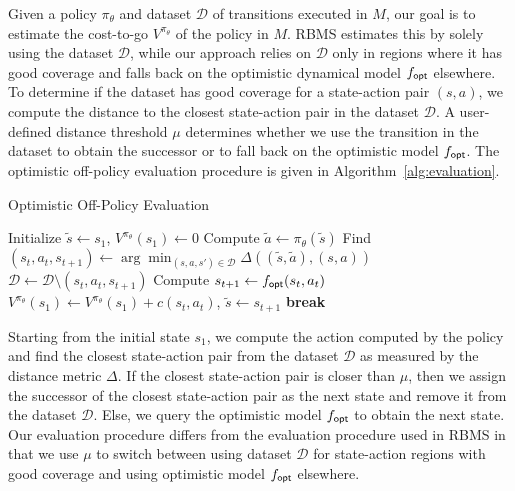 Given a policy $\pi_\theta$ and dataset $\mathcal{D}$ of transitions
executed in $M$, our goal is to estimate the cost-to-go
$V^{\pi_\theta}$ of the policy in $M$. RBMS estimates this by solely
using the dataset $\mathcal{D}$, while our approach \taml{} relies on
$\mathcal{D}$ only in regions where it has good coverage and falls
back on the optimistic dynamical model $f_\mathsf{opt}$ elsewhere. To determine
if the dataset has good coverage for a state-action pair $(s, a)$, we
compute the distance to the closest state-action pair in the dataset
$\mathcal{D}$. A user-defined distance threshold $\mu$ determines
whether we use the transition in the dataset to obtain the successor
or to fall back on the optimistic model $f_\mathsf{opt}$. The
optimistic off-policy evaluation procedure is given in
Algorithm~\ref{alg:evaluation}.

\begin{algorithm}[t]
  \caption{Optimistic Off-Policy Evaluation}
  \begin{algorithmic}[1]
    \State Initialize $\tilde{s} \leftarrow s_1$, $V^{\pi_\theta}(s_1)
    \leftarrow 0$
    \State Compute $\tilde{a} \leftarrow \pi_\theta(\tilde{s})$
    \State Find $(s_t, a_t, s_{t+1}) \leftarrow \arg\min_{(s, a, s')
      \in \mathcal{D}} \Delta((\tilde{s}, \tilde{a}), (s, a))$
    \State $\mathcal{D} \leftarrow \mathcal{D} \setminus (s_t, a_t,
    s_{t+1})$
    \Else
    \State Compute $s_{t+1} \leftarrow f_\mathsf{opt}(s_t, a_t)$
    \EndIf
    \State $V^{\pi_\theta}(s_1) \leftarrow  V^{\pi_\theta}(s_1) + c(s_t, a_t)$,
    $\tilde{s} \leftarrow s_{t+1}$
    \State \textbf{break}
    \EndIf
    \EndFor \\
  \end{algorithmic}
  \label{alg:evaluation}
\end{algorithm}

Starting from the initial state $s_1$, we compute the action computed
by the policy and find the closest state-action pair from the dataset
$\mathcal{D}$ as measured by the distance metric $\Delta$. If the
closest state-action pair is closer than $\mu$, then we assign the
successor of the closest state-action pair as the next state and
remove it from the dataset $\mathcal{D}$. Else, we query
the optimistic model $f_\mathsf{opt}$ to obtain the next state. Our evaluation
procedure differs from the evaluation procedure used in RBMS in that
we use $\mu$ to switch between using dataset $\mathcal{D}$ for
state-action regions with good coverage and using optimistic model
$f_\mathsf{opt}$ elsewhere.


